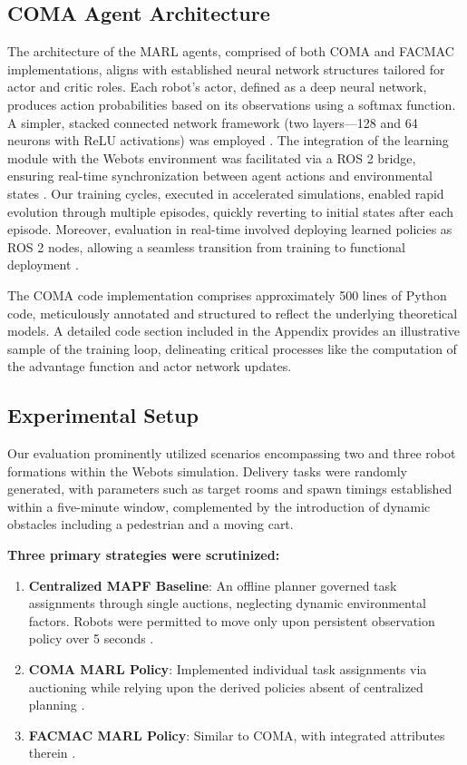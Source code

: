 \documentclass[conference]{IEEEtran}
\begin{document}
\subsection{COMA Agent Architecture}
The architecture of the MARL agents, comprised of both COMA and FACMAC implementations, aligns with established neural network structures tailored for actor and critic roles. Each robot’s actor, defined as a deep neural network, produces action probabilities based on its observations using a softmax function. A simpler, stacked connected network framework (two layers—128 and 64 neurons with ReLU activations) was employed \citep{salinas2023}. The integration of the learning module with the Webots environment was facilitated via a ROS 2 bridge, ensuring real-time synchronization between agent actions and environmental states \citep{ztouni2021}. Our training cycles, executed in accelerated simulations, enabled rapid evolution through multiple episodes, quickly reverting to initial states after each episode. Moreover, evaluation in real-time involved deploying learned policies as ROS 2 nodes, allowing a seamless transition from training to functional deployment \citep{ztouni2021}.

The COMA code implementation comprises approximately 500 lines of Python code, meticulously annotated and structured to reflect the underlying theoretical models. A detailed code section included in the Appendix provides an illustrative sample of the training loop, delineating critical processes like the computation of the advantage function and actor network updates.

\subsection{Experimental Setup}
Our evaluation prominently utilized scenarios encompassing two and three robot formations within the Webots simulation. Delivery tasks were randomly generated, with parameters such as target rooms and spawn timings established within a five-minute window, complemented by the introduction of dynamic obstacles including a pedestrian and a moving cart.





\textbf{Three primary strategies were scrutinized:}
\begin{enumerate}
    \item \textbf{Centralized MAPF Baseline}: An offline planner governed task assignments through single auctions, neglecting dynamic environmental factors. Robots were permitted to move only upon persistent observation policy over 5 seconds \citep{yang2022}.
    \item \textbf{COMA MARL Policy}: Implemented individual task assignments via auctioning while relying upon the derived policies absent of centralized planning \citep{wang2023a}.
    \item \textbf{FACMAC MARL Policy}: Similar to COMA, with integrated attributes therein \citep{wang2023a}.
\end{enumerate}
\end{document}
